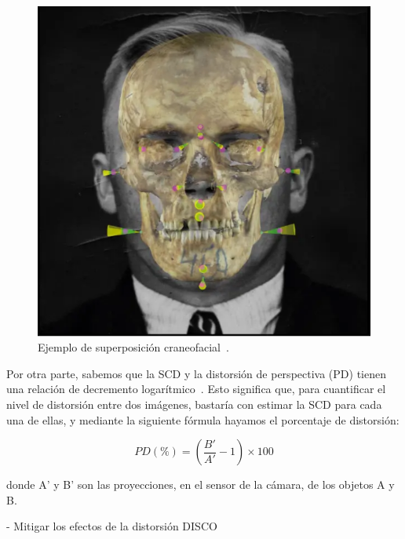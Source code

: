 \begin{figure}[h]
	\centering
	\includegraphics[scale=0.25]{imagenes/cap1/skull_superimposition.png}
	\caption{Ejemplo de superposición craneofacial~\cite{23}.}
	\label{fig2}
\end{figure}


Por otra parte, sabemos que la SCD y la distorsión de perspectiva (PD) tienen una relación de decremento logarítmico~\cite{23}. Esto significa que, para cuantificar el nivel de distorsión entre dos imágenes, bastaría con estimar la SCD para cada una de ellas, y mediante la siguiente fórmula hayamos el porcentaje de distorsión:

\[PD(\%) = (\frac{B'}{A'} - 1) \times 100\]

donde A' y B' son las proyecciones, en el sensor de la cámara, de los objetos A y B.

- Mitigar los efectos de la distorsión  DISCO


